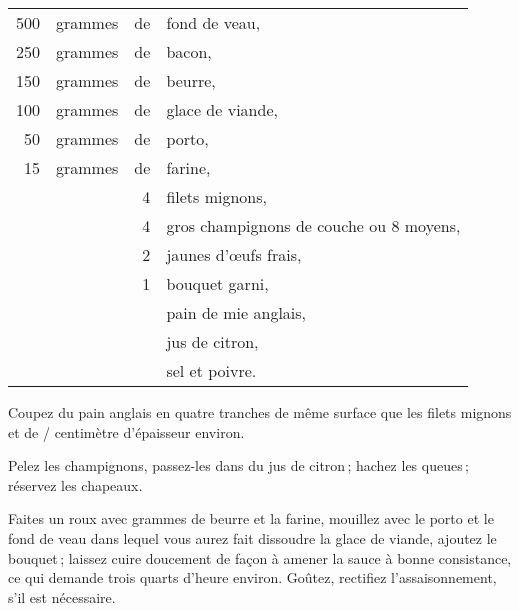 \footnotesize
\begin{longtable}{rrrp{16em}}
    500 & grammes & de & fond de veau,                                                                    \\
    250 & grammes & de & bacon,                                                                           \\
    150 & grammes & de & beurre,                                                                          \\
    100 & grammes & de & glace de viande,                                                                 \\
     50 & grammes & de & porto,                                                                           \\
     15 & grammes & de & farine,                                                                          \\
        &         &  4 & filets mignons,                                                                  \\
        &         &  4 & gros champignons de couche ou 8 moyens,                                          \\
        &         &  2 & jaunes d'œufs frais,                                                             \\
        &         &  1 & bouquet garni,                                                                   \\
        &         &    & pain de mie anglais,                                                             \\
        &         &    & jus de citron,                                                                   \\
        &         &    & sel et poivre.                                                                   \\
\end{longtable}
\normalsize

Coupez du pain anglais en quatre tranches de même surface que les filets
mignons et de {\mmm}/{\mmm} centimètre d'épaisseur environ.

Pelez les champignons, passez-les dans du jus de citron ; hachez les queues ;
réservez les chapeaux.

Faites un roux avec {\mmm} grammes de beurre et la farine, mouillez avec
le porto et le fond de veau dans lequel vous aurez fait dissoudre la glace de
viande, ajoutez le bouquet ; laissez cuire doucement de façon à amener la sauce
à bonne consistance, ce qui demande trois quarts d'heure environ. Goûtez,
rectifiez l'assaisonnement, s'il est nécessaire.


